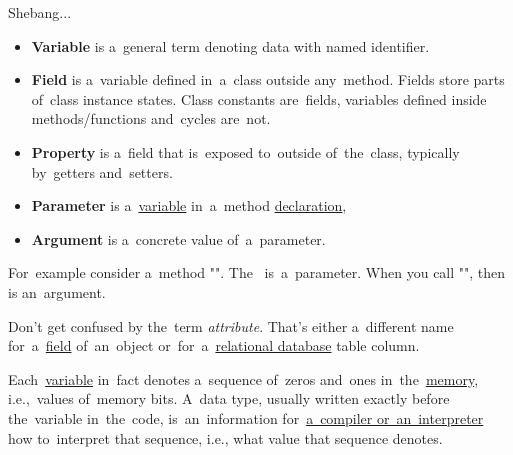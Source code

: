 \label{compiledinterpretedlanguages}

\label{scriptinglanguages}
Shebang...

\label{variablefieldproperty}
\begin{itemize}
    \item \textbf{Variable} is a~general term denoting data with named identifier.
    \item \textbf{Field} is a~variable defined in~a~class outside any~method. Fields store parts of~class instance states. Class constants are~fields, variables defined inside \mbox{methods/functions} and~cycles are~not.
    \item \textbf{Property} is a~field that is~exposed to~outside of~the~class, typically by~getters and~setters.
\end{itemize}

\label{parameterargument}
\begin{itemize}
    \item \textbf{Parameter} is a~\hyperref[variablefieldproperty]{variable} in~a~method \hyperref[declarationdefinition]{declaration},
    \item \textbf{Argument} is a~concrete value of~a~parameter.
\end{itemize}
For~example consider a~method "". The~ is~a~parameter. When you call "", then  is an~argument.

\warning Don't get confused by the~term \textit{attribute}. That's either a~different name for~a~\hyperref[variablefieldproperty]{field} of~an~object or~for~a~\hyperref[relationaldatabase]{relational database} table column.

\label{datatypes}
Each~\hyperref[variablefieldproperty]{variable} in~fact denotes a~sequence of~zeros and~ones in~the~\hyperref[systemmemory]{memory}, i.e.,~values of~memory bits. A~data type, usually written exactly before the~variable in~the~code, is~an~information for~\hyperref[compiledinterpretedlanguages]{a~compiler or~an~interpreter} how to~interpret that sequence, i.e., what value that sequence denotes.

